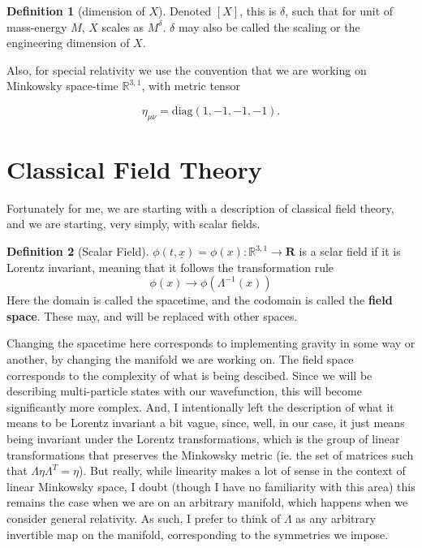\documentclass{report}
\theoremstyle{definition}
\newtheorem{definition}{Definition}
\begin{document}
\begin{definition}[dimension of $X$]
  Denoted $[X]$, this is $\delta$, such that for unit of mass-energy $M$, $X$
  scales as $M^\delta$. $\delta$ may also be called the scaling or the
  engineering dimension of $X$.
\end{definition}

Also, for special relativity we use the convention that we are working on
Minkowsky space-time $\mathbb{R}^{3, 1}$, with metric tensor

$$ \eta_{\mu \nu} = \text{diag}(1, -1, -1, -1). $$

\section{Classical Field Theory}

Fortunately for me, we are starting with a description of classical field
theory, and we are starting, very simply, with scalar fields.

\begin{definition}[Scalar Field]
  $\phi(t, \underline{x}) = \phi(x) : \mathbb{R}^{3, 1} \to \mathbf{R}$ is a sclar field
  if it is Lorentz invariant, meaning that it follows the transformation rule
  $$ \phi(x) \to \phi(\Lambda^{-1}(x)) $$
  Here the domain is called the spacetime, and the codomain is called the
  \textbf{field space}. These may, and will be replaced with other spaces.
\end{definition}

Changing the spacetime here corresponds to implementing gravity in some way or
another, by changing the manifold we are working on. The field space corresponds
to the complexity of what is being descibed. Since we will be describing
multi-particle states with our wavefunction, this will become significantly more
complex. And, I intentionally left the description of what it means to be
Lorentz invariant a bit vague, since, well, in our case, it just means being
invariant under the Lorentz transformations, which is the group of
linear transformations that preserves the Minkowsky metric (ie. the set of
matrices such that $\Lambda \eta \Lambda^T = \eta$). But really, while linearity
makes a lot of sense in the context of linear Minkowsky space, I doubt (though I
have no familiarity with this area) this remains the case when we are on an
arbitrary manifold, which happens when we consider general relativity. As such,
I prefer to think of $\Lambda$ as any arbitrary invertible map on the manifold,
corresponding to the symmetries we impose. 
\end{document}
